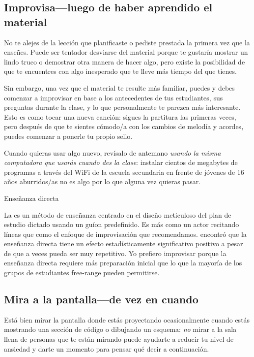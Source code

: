 \subsection*{Improvisa---luego de haber aprendido el material}

No te alejes de la lección que planificaste o pediste prestada la primera vez que la enseñes.
Puede ser tentador desviarse del material
porque te gustaría mostrar un lindo truco o demostrar otra manera de hacer algo,
pero existe la posibilidad de que te encuentres con algo inesperado
que te lleve más tiempo del que tienes.

Sin embargo, una vez que el material te resulte más familiar,
puedes y debes comenzar a improvisar en base a los antecedentes de tus estudiantes,
sus preguntas durante la clase,
y lo que personalmente te parezca más interesante.
Esto es como tocar una nueva canción:
sigues la partitura las primeras veces,
pero después de que te sientes cómodo/a con los cambios de melodía y acordes,
puedes comenzar a ponerle tu propio sello.

Cuando quieras usar algo nuevo,
revísalo de antemano
\emph{usando la misma computadora que usarás cuando des la clase}:
instalar cientos de megabytes de programas a través del WiFi de la escuela secundaria
en frente de jóvenes de 16 años aburridos/as no es algo por lo que alguna vez quieras pasar.

\begin{aside}{Enseñanza directa}

  La  es un método de enseñanza
  centrado en el diseño meticuloso del plan de estudio dictado usando un guíon predefinido.
  Es más como un actor recitando líneas que como el enfoque de improvisación que recomendamos.
  \cite{Stoc2018} encontró que la enseñanza directa tiene un efecto estadísticamente significativo positivo
  a pesar de que a veces pueda ser muy repetitivo.
  Yo prefiero improvisar porque la enseñanza directa requiere más preparación inicial que lo que la mayoría
  de los grupos de estudiantes free-range pueden permitirse.
\end{aside}

\subsection*{Mira a la pantalla---de vez en cuando}

Está bien mirar la pantalla donde estás proyectando ocasionalmente
cuando estás mostrando una sección de código o dibujando un esquema:
\emph{no} mirar a la sala llena de personas que te están mirando
puede ayudarte a reducir tu nivel de ansiedad y darte un momento para pensar qué decir a continuación.

